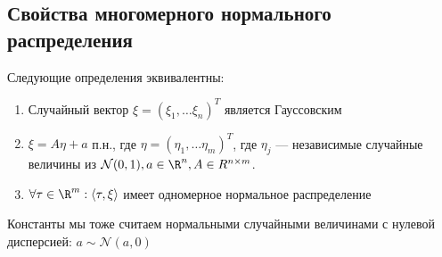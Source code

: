 \subsection{Свойства многомерного нормального распределения}

\begin{theorem}
    Следующие определения эквивалентны:
    \begin{enumerate}
        \item Случайный вектор \(\xi = (\xi_1, \dots \xi_n)^T\) является Гауссовским
        \item \(\xi = A\eta + a\) п.н., где \(\eta = (\eta_1, \dots \eta_m)^T\), где \(\eta_j\) --- независимые случайные величины из \(\mathcal{N}(0, 1), a \in \R^n, A \in R^{n \times m}\).
        \item \(\forall \tau \in \R^m: \langle \tau, \xi \rangle\) имеет одномерное нормальное распределение
    \end{enumerate}
\end{theorem}
\begin{note}
    Константы мы тоже считаем нормальными случайными величинами с нулевой дисперсией: \(a \sim \mathcal{N}(a, 0)\)
\end{note}
